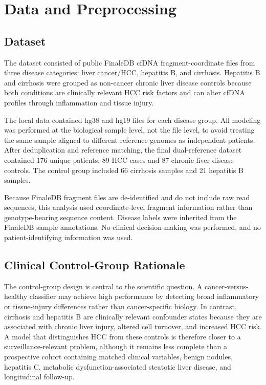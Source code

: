 \documentclass[conference]{IEEEtran}
\begin{document}
\section{Data and Preprocessing}
\subsection{Dataset}
The dataset consisted of public FinaleDB cfDNA fragment-coordinate files from three disease categories: liver cancer/HCC, hepatitis B, and cirrhosis. Hepatitis B and cirrhosis were grouped as non-cancer chronic liver disease controls because both conditions are clinically relevant HCC risk factors and can alter cfDNA profiles through inflammation and tissue injury.

The local data contained hg38 and hg19 files for each disease group. All modeling was performed at the biological sample level, not the file level, to avoid treating the same sample aligned to different reference genomes as independent patients. After deduplication and reference matching, the final dual-reference dataset contained 176 unique patients: 89 HCC cases and 87 chronic liver disease controls. The control group included 66 cirrhosis samples and 21 hepatitis B samples.

Because FinaleDB fragment files are de-identified and do not include raw read sequences, this analysis used coordinate-level fragment information rather than genotype-bearing sequence content. Disease labels were inherited from the FinaleDB sample annotations. No clinical decision-making was performed, and no patient-identifying information was used.

\subsection{Clinical Control-Group Rationale}
The control-group design is central to the scientific question. A cancer-versus-healthy classifier may achieve high performance by detecting broad inflammatory or tissue-injury differences rather than cancer-specific biology. In contrast, cirrhosis and hepatitis B are clinically relevant confounder states because they are associated with chronic liver injury, altered cell turnover, and increased HCC risk. A model that distinguishes HCC from these controls is therefore closer to a surveillance-relevant problem, although it remains less complete than a prospective cohort containing matched clinical variables, benign nodules, hepatitis C, metabolic dysfunction-associated steatotic liver disease, and longitudinal follow-up.
\end{document}
